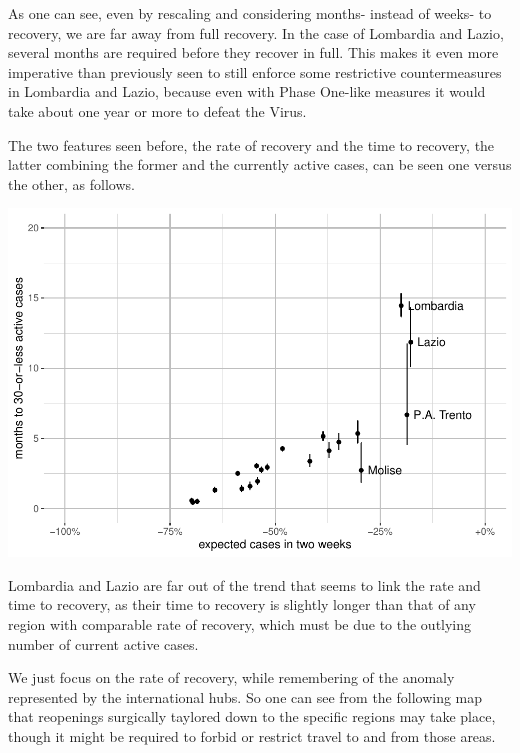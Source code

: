 \documentclass[
  6pt,
]{article}
\begin{document}
As one can see, even by rescaling and considering months- instead of
weeks- to recovery, we are far away from full recovery. In the case of
Lombardia and Lazio, several months are required before they recover in
full. This makes it even more imperative than previously seen to still
enforce some restrictive countermeasures in Lombardia and Lazio, because
even with Phase One-like measures it would take about one year or more
to defeat the Virus.

The two features seen before, the rate of recovery and the time to
recovery, the latter combining the former and the currently active
cases, can be seen one versus the other, as follows.

\begin{center}\includegraphics{Report_SC_Group3_files/figure-latex/unnamed-chunk-36-1} \end{center}

Lombardia and Lazio are far out of the trend that seems to link the rate
and time to recovery, as their time to recovery is slightly longer than
that of any region with comparable rate of recovery, which must be due
to the outlying number of current active cases.

We just focus on the rate of recovery, while remembering of the anomaly
represented by the international hubs. So one can see from the following
map that reopenings surgically taylored down to the specific regions may
take place, though it might be required to forbid or restrict travel to
and from those areas.
\end{document}
